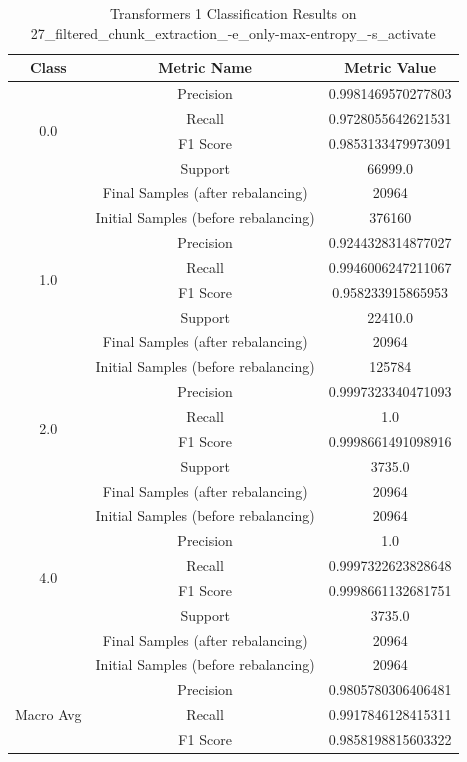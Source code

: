 \begin{longtable}{|c|c|c|}
\caption{Transformers 1 Classification Results on 27\_filtered\_chunk\_extraction\_-e\_only-max-entropy\_-s\_activate} \label{tab:27_filtered_chunk_extraction_-e_only-max-entropy_-s_activate_transformers_1_classifiers_results} \\
\hline
Class & Metric Name & Metric Value \\
\hline
\multirow{4}{*}{0.0} & Precision & 0.9981469570277803 \\
 & Recall & 0.9728055642621531 \\
 & F1 Score & 0.9853133479973091 \\
 & Support & 66999.0 \\
 & Final Samples (after rebalancing) & 20964 \\
 & Initial Samples (before rebalancing) & 376160 \\
\hline
\multirow{4}{*}{1.0} & Precision & 0.9244328314877027 \\
 & Recall & 0.9946006247211067 \\
 & F1 Score & 0.958233915865953 \\
 & Support & 22410.0 \\
 & Final Samples (after rebalancing) & 20964 \\
 & Initial Samples (before rebalancing) & 125784 \\
\hline
\multirow{4}{*}{2.0} & Precision & 0.9997323340471093 \\
 & Recall & 1.0 \\
 & F1 Score & 0.9998661491098916 \\
 & Support & 3735.0 \\
 & Final Samples (after rebalancing) & 20964 \\
 & Initial Samples (before rebalancing) & 20964 \\
\hline
\multirow{4}{*}{4.0} & Precision & 1.0 \\
 & Recall & 0.9997322623828648 \\
 & F1 Score & 0.9998661132681751 \\
 & Support & 3735.0 \\
 & Final Samples (after rebalancing) & 20964 \\
 & Initial Samples (before rebalancing) & 20964 \\
\hline
\multirow{4}{*}{Macro Avg} & Precision & 0.9805780306406481 \\
 & Recall & 0.9917846128415311 \\
 & F1 Score & 0.9858198815603322 \\

\end{longtable}
